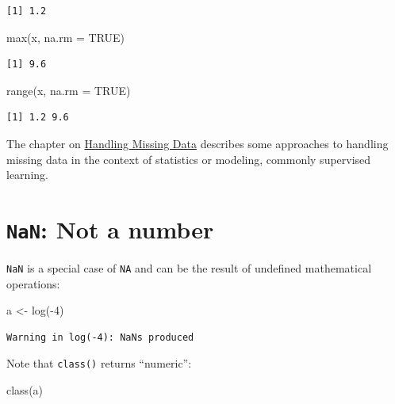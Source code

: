 \documentclass[
]{book}
\newenvironment{Shaded}{\begin{snugshade}}{\end{snugshade}}
\newcommand{\AttributeTok}[1]{\textcolor[rgb]{0.77,0.63,0.00}{#1}}
\newcommand{\ConstantTok}[1]{\textcolor[rgb]{0.00,0.00,0.00}{#1}}
\newcommand{\DecValTok}[1]{\textcolor[rgb]{0.00,0.00,0.81}{#1}}
\newcommand{\FunctionTok}[1]{\textcolor[rgb]{0.00,0.00,0.00}{#1}}
\newcommand{\NormalTok}[1]{#1}
\newcommand{\OtherTok}[1]{\textcolor[rgb]{0.56,0.35,0.01}{#1}}
\newcommand{\SpecialCharTok}[1]{\textcolor[rgb]{0.00,0.00,0.00}{#1}}
\begin{document}
\begin{verbatim}
[1] 1.2
\end{verbatim}

\begin{Shaded}
\begin{Highlighting}[]
\FunctionTok{max}\NormalTok{(x, }\AttributeTok{na.rm =} \ConstantTok{TRUE}\NormalTok{)}
\end{Highlighting}
\end{Shaded}

\begin{verbatim}
[1] 9.6
\end{verbatim}

\begin{Shaded}
\begin{Highlighting}[]
\FunctionTok{range}\NormalTok{(x, }\AttributeTok{na.rm =} \ConstantTok{TRUE}\NormalTok{)}
\end{Highlighting}
\end{Shaded}

\begin{verbatim}
[1] 1.2 9.6
\end{verbatim}

The chapter on \protect\hyperlink{missingdata}{Handling Missing Data} describes some approaches to handling missing data in the context of statistics or modeling, commonly supervised learning.

\hypertarget{nan-not-a-number}{%
\section{\texorpdfstring{\texttt{NaN}: Not a number}{NaN: Not a number}}\label{nan-not-a-number}}

\texttt{NaN} is a special case of \texttt{NA} and can be the result of undefined mathematical operations:

\begin{Shaded}
\begin{Highlighting}[]
\NormalTok{a }\OtherTok{\textless{}{-}} \FunctionTok{log}\NormalTok{(}\SpecialCharTok{{-}}\DecValTok{4}\NormalTok{)}
\end{Highlighting}
\end{Shaded}

\begin{verbatim}
Warning in log(-4): NaNs produced
\end{verbatim}

Note that \texttt{class()} returns ``numeric'':

\begin{Shaded}
\begin{Highlighting}[]
\FunctionTok{class}\NormalTok{(a)}
\end{Highlighting}
\end{Shaded}
\end{document}
